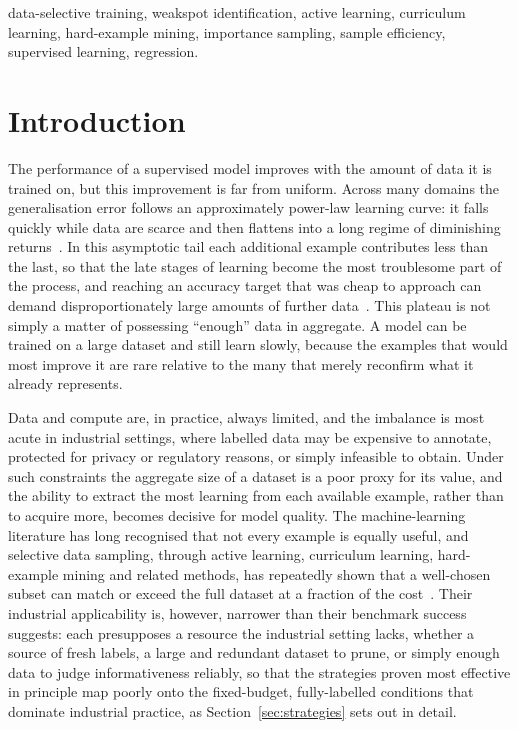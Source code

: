 \documentclass[conference]{IEEEtran}
\begin{document}
\begin{IEEEkeywords}
data-selective training, weakspot identification, active learning,
curriculum learning, hard-example mining, importance sampling, sample
efficiency, supervised learning, regression.
\end{IEEEkeywords}

\section{Introduction}
\label{sec:intro}

The performance of a supervised model improves with the amount of data it is
trained on, but this improvement is far from uniform. Across many domains the
generalisation error follows an approximately power-law learning
curve: it falls quickly while data are scarce and then flattens into a long
regime of diminishing returns~\cite{hestness2017}. In this asymptotic tail each
additional example contributes less than the last, so that the late stages of
learning become the most troublesome part of the process, and reaching an
accuracy target that was cheap to approach can demand disproportionately large
amounts of further data~\cite{hestness2017,sorscher2022}. This plateau is not
simply a matter of possessing ``enough'' data in aggregate. A model can be
trained on a large dataset and still learn slowly, because the examples that
would most improve it are rare relative to the many that merely reconfirm what it
already represents.

Data and compute are, in practice, always limited, and the imbalance is most acute in
industrial settings, where labelled data may be expensive to annotate, protected for
privacy or regulatory reasons, or simply infeasible to obtain. Under such constraints
the aggregate size of a dataset is a poor proxy for its value, and the ability to
extract the most learning from each available example, rather than to acquire more,
becomes decisive for model quality. The machine-learning literature has long recognised
that not every example is equally useful, and selective data sampling, through active
learning, curriculum learning, hard-example mining and related methods, has repeatedly
shown that a well-chosen subset can match or exceed the full dataset at a fraction of
the cost~\cite{settles2009,sorscher2022,katharopoulos2018}. Their industrial
applicability is, however, narrower than their benchmark success suggests: each
presupposes a resource the industrial setting lacks, whether a source of fresh labels, a
large and redundant dataset to prune, or simply enough data to judge informativeness
reliably, so that the strategies proven most effective in principle map poorly onto the
fixed-budget, fully-labelled conditions that dominate industrial practice, as
Section~\ref{sec:strategies} sets out in detail.
\end{document}
